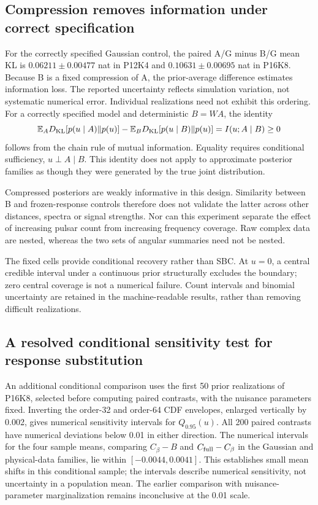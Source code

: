 \documentclass[11pt,a4paper]{article}
\begin{document}
\subsection{Compression removes information under correct specification}
For the correctly specified Gaussian control, the paired A/G minus B/G mean KL is $0.06211\pm0.00477$ nat in P12K4 and $0.10631\pm0.00695$ nat in P16K8. Because B is a fixed compression of A, the prior-average difference estimates information loss. The reported uncertainty reflects simulation variation, not systematic numerical error. Individual realizations need not exhibit this ordering. For a correctly specified model and deterministic $B=W A$, the identity
\begin{equation}
 \mathbb E_A D_{\rm KL}[p(u\mid A)\Vert p(u)]-
 \mathbb E_B D_{\rm KL}[p(u\mid B)\Vert p(u)]
 =I(u;A\mid B)\geq0
\end{equation}
follows from the chain rule of mutual information. Equality requires conditional sufficiency, $u\perp A\mid B$. This identity does not apply to approximate posterior families as though they were generated by the true joint distribution.

Compressed posteriors are weakly informative in this design. Similarity between B and frozen-response controls therefore does not validate the latter across other distances, spectra or signal strengths. Nor can this experiment separate the effect of increasing pulsar count from increasing frequency coverage. Raw complex data are nested, whereas the two sets of angular summaries need not be nested.

The fixed cells provide conditional recovery rather than SBC. At $u=0$, a central credible interval under a continuous prior structurally excludes the boundary; zero central coverage is not a numerical failure. Count intervals and binomial uncertainty are retained in the machine-readable results, rather than removing difficult realizations.

\subsection{A resolved conditional sensitivity test for response substitution}
An additional conditional comparison uses the first 50 prior realizations of P16K8, selected before computing paired contrasts, with the nuisance parameters fixed. Inverting the order-32 and order-64 CDF envelopes, enlarged vertically by 0.002, gives numerical sensitivity intervals for $Q_{0.95}(u)$. All 200 paired contrasts have numerical deviations below 0.01 in either direction. The numerical intervals for the four sample means, comparing $C_\beta-B$ and $C_{\rm full}-C_\beta$ in the Gaussian and physical-data families, lie within $[-0.0044,0.0041]$. This establishes small mean shifts in this conditional sample; the intervals describe numerical sensitivity, not uncertainty in a population mean. The earlier comparison with nuisance-parameter marginalization remains inconclusive at the 0.01 scale.
\end{document}
